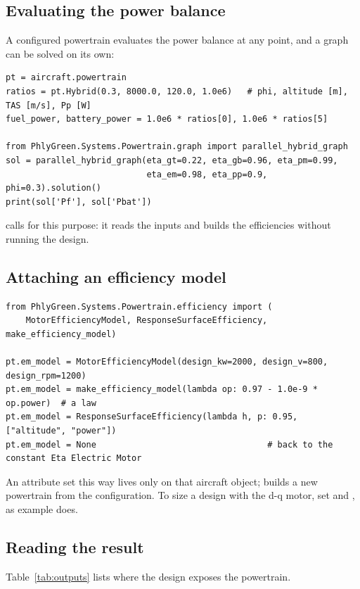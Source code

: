 \documentclass[a4paper,11pt]{article}
\begin{document}
\subsection{Evaluating the power balance}
A configured powertrain evaluates the power balance at any point, and a graph can be solved
on its own:
\begin{lstlisting}
pt = aircraft.powertrain
ratios = pt.Hybrid(0.3, 8000.0, 120.0, 1.0e6)   # phi, altitude [m], TAS [m/s], Pp [W]
fuel_power, battery_power = 1.0e6 * ratios[0], 1.0e6 * ratios[5]

from PhlyGreen.Systems.Powertrain.graph import parallel_hybrid_graph
sol = parallel_hybrid_graph(eta_gt=0.22, eta_gb=0.96, eta_pm=0.99,
                            eta_em=0.98, eta_pp=0.9, phi=0.3).solution()
print(sol['Pf'], sol['Pbat'])
\end{lstlisting}
 calls  for this purpose:
it reads the inputs and builds the efficiencies without running the design.

\subsection{Attaching an efficiency model}
\begin{lstlisting}
from PhlyGreen.Systems.Powertrain.efficiency import (
    MotorEfficiencyModel, ResponseSurfaceEfficiency, make_efficiency_model)

pt.em_model = MotorEfficiencyModel(design_kw=2000, design_v=800, design_rpm=1200)
pt.em_model = make_efficiency_model(lambda op: 0.97 - 1.0e-9 * op.power)  # a law
pt.em_model = ResponseSurfaceEfficiency(lambda h, p: 0.95, ["altitude", "power"])
pt.em_model = None                                  # back to the constant Eta Electric Motor
\end{lstlisting}
An attribute set this way lives only on that aircraft object;  builds a new
powertrain from the configuration. To size a design with the d-q motor, set
 and ,
as example  does.

\subsection{Reading the result}
Table~\ref{tab:outputs} lists where the design exposes the powertrain.
\end{document}
